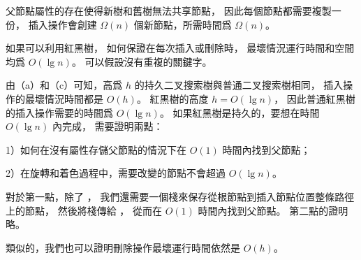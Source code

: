 \startANSWER
父節點屬性的存在使得新樹和舊樹無法共享節點，
因此每個節點都需要複製一份，
插入操作會創建 $\Omega(n)$ 個新節點，所需時間爲 $\Omega(n)$。
\stopANSWER

\startitem%
如果可以利用紅黑樹，
如何保證在每次插入或刪除時，
最壞情況運行時間和空間均爲 $O(\lg{n})$。
可以假設沒有重複的關鍵字。
\stopitem

\startANSWER
由（a）和（c）可知，高爲 $h$ 的持久二叉搜索樹與普通二叉搜索樹相同，
插入操作的最壞情況時間都是 $O(h)$。
紅黑樹的高度 $h=O(\lg n)$，
因此普通紅黑樹的插入操作需要的時間爲 $O(\lg n)$。
如果紅黑樹是持久的，要想在時間 $O(\lg n)$ 內完成，
需要證明兩點：

1）如何在沒有屬性存儲父節點的情況下在 $O(1)$ 時間內找到父節點；

2）在旋轉和着色過程中，需要改變的節點不會超過 $O(\lg n)$。

對於第一點，除了 ，
我們還需要一個棧來保存從根節點到插入節點位置整條路徑上的節點，
然後將棧傳給 ，
從而在 $O(1)$ 時間內找到父節點。
第二點的證明略。

類似的，我們也可以證明刪除操作最壞運行時間依然是 $O(h)$。
\stopANSWER

\stopigBase
\stopPROBLEM
